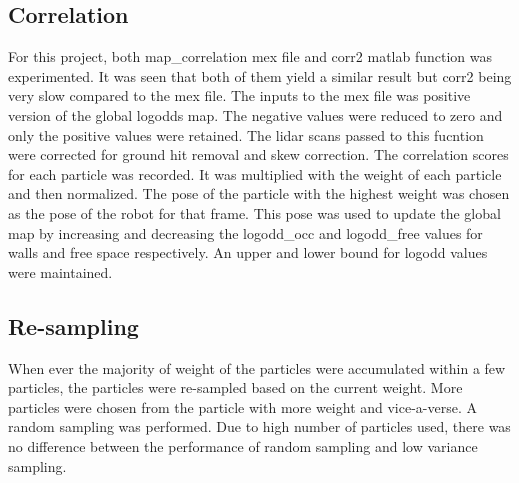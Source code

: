 \documentclass[fleqn,10pt]{SelfArx} %
\begin{document}
\subsection{Correlation}
For this project, both map\_correlation mex file and corr2 matlab function was experimented. It was seen that both of them yield a similar result but corr2 being very slow compared to the mex file. The inputs to the mex file was positive version of the global logodds map. The negative values were reduced to zero and only the positive values were retained. The lidar scans passed to this fucntion were corrected for ground hit removal and skew correction. The correlation scores for each particle was recorded. It was multiplied with the weight of each particle and then normalized. The pose of the particle with the highest weight was chosen as the pose of the robot for that frame. This pose was used to update the global map by increasing and decreasing the logodd\_occ and logodd\_free values for walls and free space respectively. An upper and lower bound for logodd values were maintained.

\subsection{Re-sampling}
When ever the majority of weight of the particles were accumulated within a few particles, the particles were re-sampled based on the current weight. More particles were chosen from the particle with more weight and vice-a-verse. A random sampling was performed. Due to high number of particles used, there was no difference between the performance of random sampling and low variance sampling.
\end{document}
